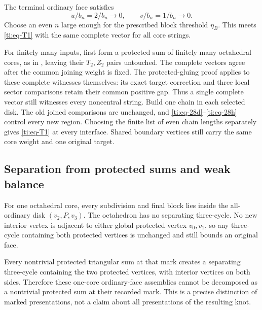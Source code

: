 \documentclass[11pt]{article}
\numberwithin{equation}{section}
\theoremstyle{definition}\newtheorem{definition}[theorem]{Definition}
\theoremstyle{remark}\newtheorem{remark}[theorem]{Remark}
\begin{document}
The terminal ordinary face satisfies
\begin{equation}\label{ti:eq-29}
u/b_n=2/b_n\longrightarrow0,\qquad
v/b_n=1/b_n\longrightarrow0.
\end{equation}
Choose an even \(n\) large enough for the prescribed block threshold \(\eta_B\). This meets \eqref{ti:eq-T1} with the same complete vector for all core strings.

For finitely many inputs, first form a protected sum of finitely many octahedral cores, as in \cite[Theorem~5.3]{Planar}, leaving their \(T_2,Z_2\) pairs untouched. The complete vectors agree after the common joining weight is fixed.
The protected-gluing proof applies to these complete witnesses
themselves: its exact target correction and three local sector
comparisons retain their common positive gap. Thus a single complete
vector still witnesses every noncentral string. Build one chain in each selected disk. The old joined comparisons are unchanged, and \eqref{ti:eq-28d}--\eqref{ti:eq-28h} control every new region. Choosing the finite list of even chain lengths separately gives \eqref{ti:eq-T1} at every interface. Shared boundary vertices still carry the same core weight and one original target.

\subsection{Separation from protected sums and weak balance}\label{separation-from-protected-sums-and-weak-balance}

For one octahedral core, every subdivision and final block lies inside the all-ordinary disk \((v_2,P,v_3)\). The octahedron has no separating three-cycle. No new interior vertex is adjacent to either global protected vertex \(v_0,v_1\), so any three-cycle containing both protected vertices is unchanged and still bounds an original face.

Every nontrivial protected triangular sum at that mark creates a separating three-cycle containing the two protected vertices, with interior vertices on both sides. Therefore these one-core ordinary-face assemblies cannot be decomposed as a nontrivial protected sum at their recorded mark. This is a precise distinction of marked presentations, not a claim about all presentations of the resulting knot.
\end{document}

